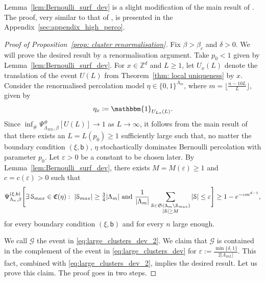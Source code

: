 \documentclass[11pt,a4paper]{article}
\theoremstyle{definition}
\numberwithin{equation}{section}
\begin{document}
Lemma~\ref{lem:Bernoulli_surf_dev} is a slight modification of the main result of \cite{DP96}. The proof, very similar to that of \cite{DP96}, is presented in the Appendix~\ref{sec:appendix_high_perco}. 


\begin{proof}[Proof of Proposition~\textup{\ref{prop: cluster renormalisation}}]
Fix $\beta>\beta_c$ and $\delta>0$. We will prove the desired result by a renormalisation argument. Take $p_0<1$ given by Lemma~\ref{lem:Bernoulli_surf_dev}. For $x\in \mathbb{Z}^d$ and $L\geq 1$, let $U_x(L)$ denote the translation of the event $U(L)$ from Theorem~\ref{thm: local uniqueness} by $x$. Consider the renormalised percolation model $\eta\in \{0,1\}^{\Lambda_m}$, where $m=\lfloor \frac{n-10L}{L}\rfloor$, given by 
$$\eta_x \coloneqq \mathbbm{1}_{U_{Lx}(L)}.$$
Since $\inf_{\#}\Psi^{\#}_{\Lambda_{10L},\beta}[U(L)] \to 1$ as $L\to\infty$, it follows from the main result of \cite{LSS97} that there exists an $L=L(p_0)\geq 1$ sufficiently large such that, no matter the boundary condition $(\xi,\mathsf{b})$, $\eta$ stochastically dominates Bernoulli percolation with parameter $p_0$. Let $\varepsilon>0$ be a constant to be chosen later. By Lemma~\ref{lem:Bernoulli_surf_dev}, there exists $M=M(\varepsilon)\geq1$ and $c=c(\varepsilon)>0$ such that  
\begin{equation}\label{eq:large_clusters_dev_2}
\Psi^{(\xi,\mathsf{b})}_{\Lambda_n,\beta} \Bigg[ \exists \, \mathcal{S}_{\rm max} \in \mathfrak{C}(\eta):~ |\mathcal{S}_{\rm max}|\geq \tfrac{3}{4}|\Lambda_m| \text{ and } \frac{1}{|\Lambda_m|} \sum_{
\substack{\mathcal{S}\in \mathfrak{S}(\Lambda_m\setminus \mathcal{S}_{\rm max})\\ |\mathcal{S}|\geq M}} |\mathcal{S}| \leq \varepsilon \Bigg]\geq 1- e^{-cm^{d-1}},
\end{equation}
for every boundary condition $(\xi,\mathsf{b})$ and for every $n$ large enough. 

We call $\mathcal{G}$ the event in \eqref{eq:large_clusters_dev_2}.
We claim that $\mathcal{G}$ is contained in the complement of the event in \eqref{eq:large_clusters_dev} for $\varepsilon:=\frac{\min\{\delta,1\}}{2|\Lambda_{16L}|}$. This fact, combined with \eqref{eq:large_clusters_dev_2}, implies the desired result. Let us prove this claim. The proof goes in two steps.


\end{proof}
\end{document}
